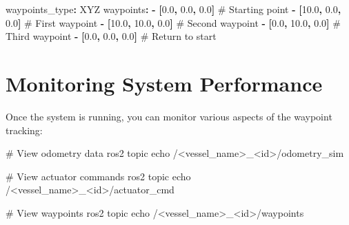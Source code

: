 \documentclass[
  letterpaper,
  DIV=11,
  numbers=noendperiod]{scrreprt}
\newenvironment{Shaded}{\begin{snugshade}}{\end{snugshade}}
\newcommand{\AttributeTok}[1]{\textcolor[rgb]{0.40,0.45,0.13}{#1}}
\newcommand{\CommentTok}[1]{\textcolor[rgb]{0.37,0.37,0.37}{#1}}
\newcommand{\ExtensionTok}[1]{\textcolor[rgb]{0.00,0.23,0.31}{#1}}
\newcommand{\FloatTok}[1]{\textcolor[rgb]{0.68,0.00,0.00}{#1}}
\newcommand{\FunctionTok}[1]{\textcolor[rgb]{0.28,0.35,0.67}{#1}}
\newcommand{\KeywordTok}[1]{\textcolor[rgb]{0.00,0.23,0.31}{\textbf{#1}}}
\newcommand{\NormalTok}[1]{\textcolor[rgb]{0.00,0.23,0.31}{#1}}
\newcommand{\OperatorTok}[1]{\textcolor[rgb]{0.37,0.37,0.37}{#1}}
\begin{document}
\begin{Shaded}
\begin{Highlighting}[]
\FunctionTok{waypoints\_type}\KeywordTok{:}\AttributeTok{ XYZ}
\FunctionTok{waypoints}\KeywordTok{:}
\KeywordTok{{-}}\AttributeTok{ }\KeywordTok{[}\FloatTok{0.0}\KeywordTok{,}\AttributeTok{ }\FloatTok{0.0}\KeywordTok{,}\AttributeTok{ }\FloatTok{0.0}\KeywordTok{]}\CommentTok{     \# Starting point}
\KeywordTok{{-}}\AttributeTok{ }\KeywordTok{[}\FloatTok{10.0}\KeywordTok{,}\AttributeTok{ }\FloatTok{0.0}\KeywordTok{,}\AttributeTok{ }\FloatTok{0.0}\KeywordTok{]}\CommentTok{    \# First waypoint}
\KeywordTok{{-}}\AttributeTok{ }\KeywordTok{[}\FloatTok{10.0}\KeywordTok{,}\AttributeTok{ }\FloatTok{10.0}\KeywordTok{,}\AttributeTok{ }\FloatTok{0.0}\KeywordTok{]}\CommentTok{   \# Second waypoint}
\KeywordTok{{-}}\AttributeTok{ }\KeywordTok{[}\FloatTok{0.0}\KeywordTok{,}\AttributeTok{ }\FloatTok{10.0}\KeywordTok{,}\AttributeTok{ }\FloatTok{0.0}\KeywordTok{]}\CommentTok{    \# Third waypoint}
\KeywordTok{{-}}\AttributeTok{ }\KeywordTok{[}\FloatTok{0.0}\KeywordTok{,}\AttributeTok{ }\FloatTok{0.0}\KeywordTok{,}\AttributeTok{ }\FloatTok{0.0}\KeywordTok{]}\CommentTok{     \# Return to start}
\end{Highlighting}
\end{Shaded}

\section*{Monitoring System
Performance}\label{monitoring-system-performance}


Once the system is running, you can monitor various aspects of the
waypoint tracking:

\begin{Shaded}
\begin{Highlighting}[]
\CommentTok{\# View odometry data}
\ExtensionTok{ros2}\NormalTok{ topic echo /}\OperatorTok{\textless{}}\NormalTok{vessel\_name}\OperatorTok{\textgreater{}}\NormalTok{\_}\OperatorTok{\textless{}}\NormalTok{id}\OperatorTok{\textgreater{}}\NormalTok{/odometry\_sim}

\CommentTok{\# View actuator commands}
\ExtensionTok{ros2}\NormalTok{ topic echo /}\OperatorTok{\textless{}}\NormalTok{vessel\_name}\OperatorTok{\textgreater{}}\NormalTok{\_}\OperatorTok{\textless{}}\NormalTok{id}\OperatorTok{\textgreater{}}\NormalTok{/actuator\_cmd}

\CommentTok{\# View waypoints}
\ExtensionTok{ros2}\NormalTok{ topic echo /}\OperatorTok{\textless{}}\NormalTok{vessel\_name}\OperatorTok{\textgreater{}}\NormalTok{\_}\OperatorTok{\textless{}}\NormalTok{id}\OperatorTok{\textgreater{}}\NormalTok{/waypoints}
\end{Highlighting}
\end{Shaded}
\end{document}

